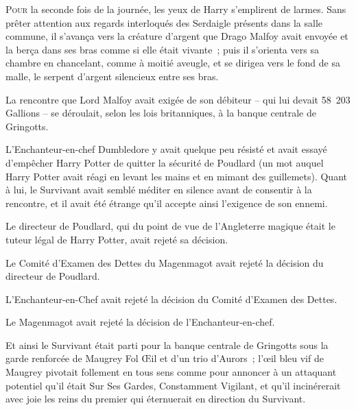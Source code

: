 
\lettrine{P}{our} la seconde fois de la journée, les yeux de Harry s'emplirent de larmes. Sans prêter attention aux regards interloqués des Serdaigle présents dans la salle commune, il s'avança vers la créature d'argent que Drago Malfoy avait envoyée et la berça dans ses bras comme si elle était vivante~; puis il s'orienta vers sa chambre en chancelant, comme à moitié aveugle, et se dirigea vers le fond de sa malle, le serpent d'argent silencieux entre ses bras.


La rencontre que Lord Malfoy avait exigée de son débiteur -- qui lui devait 58~203 Gallions -- se déroulait, selon les lois britanniques, à la banque centrale de Gringotts.

L'Enchanteur-en-chef Dumbledore y avait quelque peu résisté et avait essayé d'empêcher Harry Potter de quitter la sécurité de Poudlard (un mot auquel Harry Potter avait réagi en levant les mains et en mimant des guillemets). Quant à lui, le Survivant avait semblé méditer en silence avant de consentir à la rencontre, et il avait été étrange qu'il accepte ainsi l'exigence de son ennemi.

Le directeur de Poudlard, qui du point de vue de l'Angleterre magique était le tuteur légal de Harry Potter, avait rejeté sa décision.

Le Comité d'Examen des Dettes du Magenmagot avait rejeté la décision du directeur de Poudlard.

L'Enchanteur-en-Chef avait rejeté la décision du Comité d'Examen des Dettes.

Le Magenmagot avait rejeté la décision de l'Enchanteur-en-chef.

Et ainsi le Survivant était parti pour la banque centrale de Gringotts sous la garde renforcée de Maugrey Fol Œil et d'un trio d'Aurors~; l'œil bleu vif de Maugrey pivotait follement en tous sens comme pour annoncer à un attaquant potentiel qu'il était Sur Ses Gardes, Constamment Vigilant, et qu'il incinérerait avec joie les reins du premier qui éternuerait en direction du Survivant.

